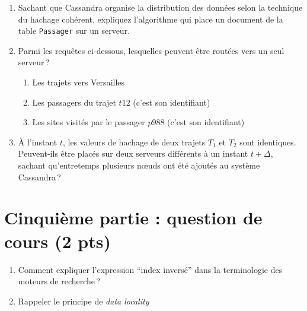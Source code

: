 \documentclass[10pt,a4paper]{article}
\begin{document}
\begin{enumerate}
 \item Sachant que Cassandra organise la distribution des données 
 selon la technique du hachage cohérent, expliquez l'algorithme qui
 place un document de la table \texttt{Passager} sur un serveur.
  
  \item Parmi les requêtes ci-dessous, lesquelles peuvent être 
  routées vers un seul serveur\,?
  
  \begin{enumerate}
  \item Les trajets vers Versailles  
   \item Les passagers du trajet  $t12$ (c'est son identifiant)
    \item Les sites visités par le passager $p988$ (c'est son identifiant) 
\end{enumerate}  


  \item À l'instant $t$, les valeurs de hachage de deux trajets
  $T_1$ et $T_2$ sont identiques.  Peuvent-ils être placés sur deux
  serveurs différents à un instant $t+\Delta$, sachant qu'entretemps 
  plusieurs nœuds ont été ajoutés au système Cassandra\,?
\end{enumerate}


\section*{Cinquième partie : question de cours (2 pts)}


\begin{enumerate}
 \item Comment expliquer l'expression ``index inversé'' dans  
     la terminologie des moteurs de recherche\,?
  
 \item Rappeler le principe de \textit{data locality}
\end{enumerate}
\end{document}
